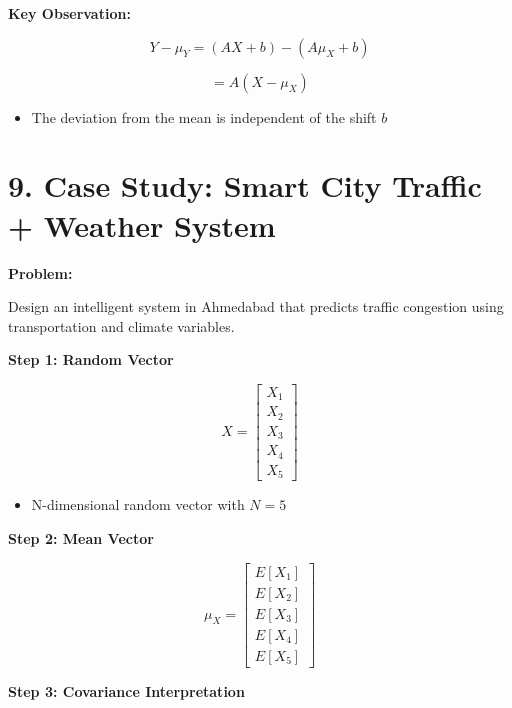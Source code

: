 ﻿\documentclass[12pt]{article}
\begin{document}
\vspace{0.2cm}


\textbf{Key Observation:}


\[
Y - \mu_Y = (AX + b) - (A\mu_X + b)
\]


\[
= A(X - \mu_X)
\]


\begin{itemize}
\item The deviation from the mean is independent of the shift $b$
\end{itemize}




\section*{9. Case Study: Smart City Traffic + Weather System}


\vspace{0.2cm}


\textbf{Problem:}


Design an intelligent system in Ahmedabad that predicts traffic congestion using transportation and climate variables.




\textbf{Step 1: Random Vector}


\[
X =
\begin{bmatrix}
X_1 \\
X_2 \\
X_3 \\
X_4 \\
X_5
\end{bmatrix}
\]


\begin{itemize}
\item N-dimensional random vector with $N = 5$
\end{itemize}




\textbf{Step 2: Mean Vector}


\[
\mu_X =
\begin{bmatrix}
E[X_1] \\
E[X_2] \\
E[X_3] \\
E[X_4] \\
E[X_5]
\end{bmatrix}
\]




\textbf{Step 3: Covariance Interpretation}
\end{document}
